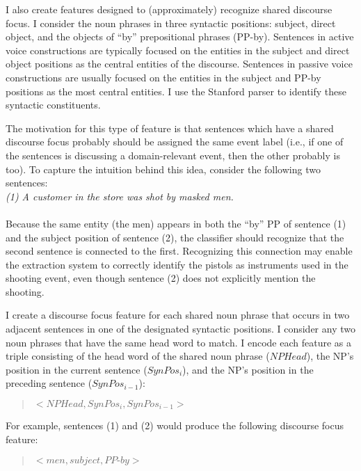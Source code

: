 I also create features designed to (approximately) recognize shared discourse focus. 
I consider the noun phrases in three syntactic positions: subject,
direct object, and the objects of ``by'' prepositional phrases
(PP-by).  Sentences in active voice constructions are typically
focused on the entities in the subject and direct object positions as the central entities
of the discourse. Sentences in passive voice constructions are
usually focused on the entities in the subject and PP-by positions as the most central
entities.  I use the Stanford parser \cite{Marneffe06} to identify
these syntactic constituents.

The motivation for this type of feature is that sentences which have a
shared discourse focus probably should be assigned the same event
label (i.e., if one of the sentences is discussing a domain-relevant event, then the other
probably is too).  To capture the intuition behind this idea, consider
the following two sentences: \\

{\it (1) A customer in the store was shot by masked men.}\\
\\
 
\noindent
Because the same entity (the men) appears in both the ``by'' PP
of sentence (1) and the subject position of sentence (2), the 
classifier should recognize that the second sentence is connected to
the first. Recognizing this connection may enable the extraction
system to correctly identify the pistols as  instruments used in the 
shooting event, even though sentence (2) does not explicitly mention the shooting.

I create a discourse focus feature for each shared noun phrase that occurs in two adjacent sentences in
one of the designated syntactic positions. 
I consider any two noun phrases that have the same head word to match.  I
encode each feature as a triple consisting of the head word of the
shared noun phrase ($NPHead$), the NP's position in the current sentence ($SynPos_{i}$), and the
NP's position in the preceding sentence ($SynPos_{i-1}$):
\vspace*{.08in}
\begin{quote}
 {\it $<NPHead, SynPos_{i}, SynPos_{i-1}>$}
\end{quote}
\vspace*{.08in}
For example, sentences (1) and (2) would produce the following discourse focus feature:
\begin{quote}
{\it $<men, subject, PP\mbox{-}by>$}
\end{quote}

